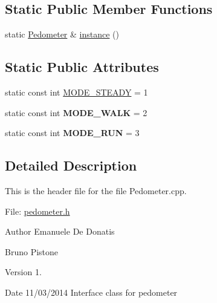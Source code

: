 \subsection*{Static Public Member Functions}
\begin{DoxyCompactItemize}
\item 
static \hyperlink{classPedometer}{Pedometer} \& \hyperlink{classPedometer_a0c788457ae234fd7dd76f73fa1455036}{instance} ()
\end{DoxyCompactItemize}
\subsection*{Static Public Attributes}
\begin{DoxyCompactItemize}
\item 
static const int \hyperlink{classPedometer_a27aa2aacbeef562588658b858085c930}{M\+O\+D\+E\+\_\+\+S\+T\+E\+A\+D\+Y} = 1
\item 
\hypertarget{classPedometer_ae30e2fdb9a7d8b1a9b7c3be5b231df97}{static const int {\bfseries M\+O\+D\+E\+\_\+\+W\+A\+L\+K} = 2}\label{classPedometer_ae30e2fdb9a7d8b1a9b7c3be5b231df97}

\item 
\hypertarget{classPedometer_a46947e1b0c6ae23f8279047a03b06048}{static const int {\bfseries M\+O\+D\+E\+\_\+\+R\+U\+N} = 3}\label{classPedometer_a46947e1b0c6ae23f8279047a03b06048}

\end{DoxyCompactItemize}


\subsection{Detailed Description}
This is the header file for the file Pedometer.\+cpp. 

File\+: \hyperlink{pedometer_8h_source}{pedometer.\+h} \begin{DoxyAuthor}{Author}
Emanuele De Donatis 

Bruno Pistone 
\end{DoxyAuthor}
\begin{DoxyVersion}{Version}
1. 
\end{DoxyVersion}
\begin{DoxyDate}{Date}
11/03/2014 Interface class for pedometer 
\end{DoxyDate}


